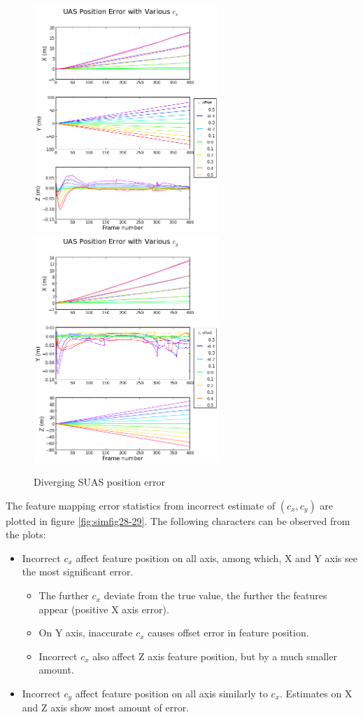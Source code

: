 \begin{figure}[h]
  \centering
  \includegraphics[width=7cm,keepaspectratio=true]{./Figures/SimulationFigures/Figure36.png}
  \includegraphics[width=7cm,keepaspectratio=true]{./Figures/SimulationFigures/Figure37.png}
  \caption{Diverging SUAS position error}
  \label{fig:simfig36-37}
\end{figure}
\FloatBarrier

The feature mapping error statistics from incorrect estimate of $ (c_{x}, c_{y})$ are plotted in figure \ref{fig:simfig28-29}. The following characters can be observed from the plots:

\begin{itemize}
  \item Incorrect $c_{x}$ affect feature position on all axis, among which, X and Y axis see the most significant error.
  \begin{itemize}
    \item The further $c_{x}$ deviate from the true value, the further the features appear (positive X axis error).
    \item On Y axis, inaccurate $c_x$ causes offset error in feature position. 
    \item Incorrect $c_{x}$ also affect Z axis feature position, but by a much smaller amount.
  \end{itemize}
  \item Incorrect $c_{y}$ affect feature position on all axis similarly to $c_{x}$. Estimates on X and Z axis show most amount of error.
\end{itemize}

